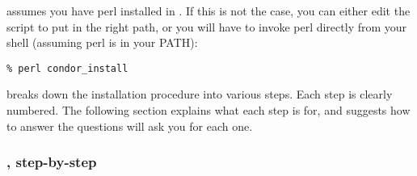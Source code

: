  assumes you have perl installed in .  If
this is not the case, you can either edit the script to put in the right
path, or you will have to invoke perl directly from your shell
(assuming perl is in your PATH):
\begin{verbatim}
% perl condor_install
\end{verbatim}

 breaks down the installation procedure into various
steps.  Each step is clearly numbered.  The following section explains
what each step is for, and suggests how to answer the questions
 will ask you for each one.

\subsubsection{, step-by-step}

